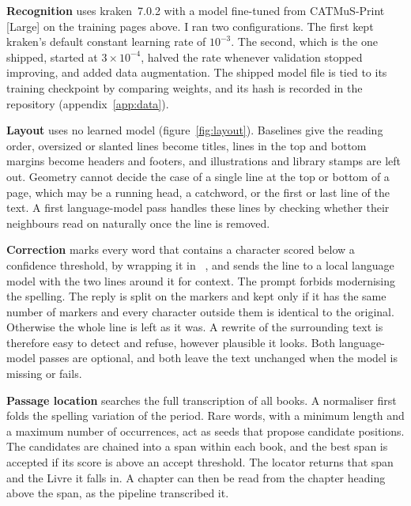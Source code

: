\textbf{Recognition} uses kraken~7.0.2 \cite{kiessling2025kraken} with a model
fine-tuned from CATMuS-Print [Large] \cite{gabay2024catmusprintlarge} on the
training pages above. I ran two configurations. The first kept kraken's default
constant learning rate of $10^{-3}$. The second, which is the one shipped,
started at $3\times10^{-4}$, halved the rate whenever validation stopped
improving, and added data augmentation. The shipped model file is tied to its
training checkpoint by comparing weights, and its hash is recorded in the
repository (appendix~\ref{app:data}).

\textbf{Layout} uses no learned model (figure~\ref{fig:layout}). Baselines give
the reading order, oversized or slanted lines become titles, lines in the top
and bottom margins become headers and footers, and illustrations and library
stamps are left out. Geometry cannot decide the case of a single line at the
top or bottom of a page, which may be a running head, a catchword, or the first
or last line of the text. A first language-model pass handles these lines by
checking whether their neighbours read on naturally once the line is removed.

\textbf{Correction} marks every word that contains a character scored below a
confidence threshold, by wrapping it in \lmark~\rmark{}, and sends the
line to a local language model with the two lines around it for context. The
prompt forbids modernising the spelling. The reply is split on the markers and
kept only if it has the same number of markers and every character outside
them is identical to the original. Otherwise the whole line is left as it was.
A rewrite of the surrounding text is therefore easy to detect and refuse,
however plausible it looks. Both language-model passes are optional, and both
leave the text unchanged when the model is missing or fails.

\textbf{Passage location} searches the full transcription of all \ocrBooks{}
books. A normaliser first folds the spelling variation of the period. Rare
words, with a minimum length and a maximum number of occurrences, act as seeds that propose candidate positions.
The candidates are chained into a span within each book, and the best span is
accepted if its score is above an accept threshold. The locator returns that
span and the Livre it falls in. A chapter can then be read from the chapter
heading above the span, as the pipeline transcribed it.

